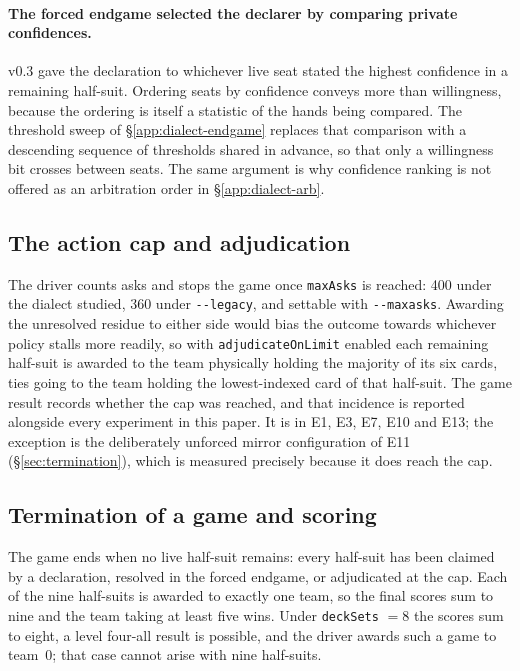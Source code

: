 \paragraph{The forced endgame selected the declarer by comparing private
confidences.} v0.3 gave the declaration to whichever live seat stated the
highest confidence in a remaining half-suit. Ordering seats by confidence
conveys more than willingness, because the ordering is itself a statistic of the
hands being compared. The threshold sweep of \S\ref{app:dialect-endgame}
replaces that comparison with a descending sequence of thresholds shared in
advance, so that only a willingness bit crosses between seats. The same argument
is why confidence ranking is not offered as an arbitration order in
\S\ref{app:dialect-arb}.

\subsection{The action cap and adjudication}

The driver counts asks and stops the game once \texttt{maxAsks} is reached: 400
under the dialect studied, 360 under \texttt{-{}-legacy}, and settable with
\texttt{-{}-maxasks}. Awarding the unresolved residue to either side would bias
the outcome towards whichever policy stalls more readily, so with
\texttt{adjudicateOnLimit} enabled each remaining half-suit is awarded to the
team physically holding the majority of its six cards, ties going to the team
holding the lowest-indexed card of that half-suit. The game result records
whether the cap was reached, and that incidence is reported alongside every
experiment in this paper. It is \numLimitRate{} in E1, E3, E7, E10 and E13; the
exception is the deliberately unforced mirror configuration of E11
(\S\ref{sec:termination}), which is measured precisely because it does reach the
cap.

\subsection{Termination of a game and scoring}

The game ends when no live half-suit remains: every half-suit has been claimed
by a declaration, resolved in the forced endgame, or adjudicated at the cap.
Each of the nine half-suits is awarded to exactly one team, so the final scores
sum to nine and the team taking at least five wins. Under \texttt{deckSets} $=8$
the scores sum to eight, a level four-all result is possible, and the driver
awards such a game to team~0; that case cannot arise with nine half-suits.

